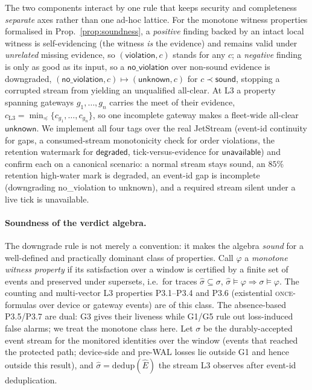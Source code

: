 \documentclass[runningheads]{llncs}
\begin{document}
The two components interact by one rule that keeps security and completeness
\emph{separate} axes rather than one ad-hoc lattice. For the monotone witness
properties formalised in Prop.~\ref{prop:soundness}, a \emph{positive} finding backed
by an intact local witness is self-evidencing (the witness \emph{is} the evidence) and
remains valid under \emph{unrelated} missing evidence, so $(\mathsf{violation},c)$
stands for any $c$; a \emph{negative} finding is only as good as its input, so a
$\mathsf{no\_violation}$ over non-\textsf{sound} evidence is downgraded,
$(\mathsf{no\_violation}, c)\mapsto(\mathsf{unknown}, c)$ for $c\prec\mathsf{sound}$,
stopping a corrupted stream from yielding an unqualified all-clear.
At L3 a property spanning gateways $g_1,\dots,g_n$ carries the meet of their evidence,
$c_{\mathrm{L3}}=\min_{\preceq}\{c_{g_1},\dots,c_{g_n}\}$, so one incomplete gateway makes
a fleet-wide all-clear $\mathsf{unknown}$. We implement all four tags over the real
JetStream (event-id continuity for gaps, a consumed-stream monotonicity check for order
violations, the retention watermark for $\mathsf{degraded}$, tick-versus-evidence for
$\mathsf{unavailable}$) and confirm each on a canonical scenario: a normal stream stays
\textsf{sound}, an $85\%$ retention high-water mark is \textsf{degraded}, an event-id gap
is \textsf{incomplete} (downgrading \textsf{no\_violation} to \textsf{unknown}), and a
required stream silent under a live tick is \textsf{unavailable}.

\paragraph{Soundness of the verdict algebra.}
The downgrade rule is not merely a convention: it makes the algebra \emph{sound} for a
well-defined and practically dominant class of properties. Call $\varphi$ a
\emph{monotone witness property} if its satisfaction over a window is certified by a
finite set of events and preserved under supersets, i.e.\ for traces
$\hat\sigma\subseteq\sigma$, $\hat\sigma\models\varphi\Rightarrow\sigma\models\varphi$.
The counting and multi-vector L3 properties P3.1--P3.4 and P3.6 (existential
\textsc{once}-formulas over device or gateway events) are of this class. The
absence-based P3.5/P3.7 are dual: G3 gives their liveness while G1/G5 rule out
loss-induced false alarms; we treat the monotone class here. Let $\sigma$ be the durably-accepted event stream for the monitored identities
over the window (events that reached the protected path; device-side and pre-WAL losses
lie outside G1 and hence outside this result), and $\hat\sigma=\mathrm{dedup}(\hat E)$
the stream L3 observes after event-id deduplication.
\end{document}
